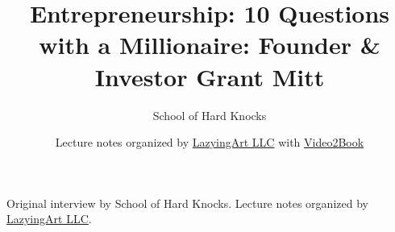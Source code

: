 \documentclass[11pt,oneside]{book}
\begin{document}
\frontmatter
\title{Entrepreneurship: 10 Questions with a Millionaire: Founder \& Investor Grant Mitt}
\author{School of Hard Knocks}
\date{Lecture notes organized by \href{https://lazying.art}{LazyingArt LLC} with \href{https://github.com/lachlanchen/Video2Book}{Video2Book}}
\maketitle
\begin{center}
\small Original interview by School of Hard Knocks. Lecture notes organized by \href{https://lazying.art}{LazyingArt LLC}.
\end{center}
\clearpage
\mainmatter

\end{document}
